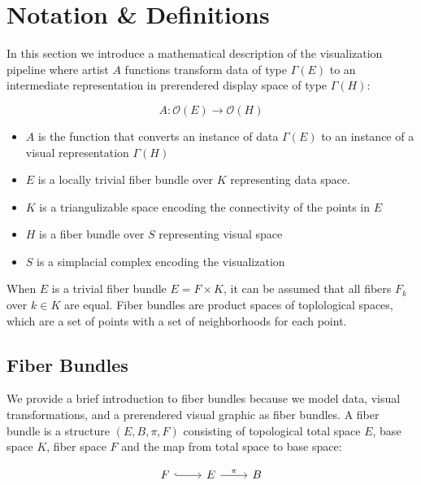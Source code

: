 \documentclass[../main.tex]{subfiles}
\begin{document}
\section{Notation \& Definitions}
In this section we introduce a mathematical description of the visualization pipeline where artist $A$ functions transform data of type $\Gamma(E)$ to an intermediate representation in prerendered display space of type $\Gamma(H)$:

\begin{equation}
    \label{eq:artist}
    A: \mathcal{O}(E) \rightarrow \mathcal{O}(H)
\end{equation}

\begin{itemize}
\item $A$ is the function that converts an instance of data $\Gamma(E)$ to an instance of a visual representation $\Gamma(H)$ 
\item $E$ is a locally trivial fiber bundle over $K$ representing data space.
\item $K$ is a triangulizable space encoding the connectivity of the points in $E$
\item $H$ is a fiber bundle over $S$ representing visual space
\item $S$ is a simplacial complex encoding the visualization
\end{itemize}

When $E$ is a trivial fiber bundle $E = F \times K$, it can be assumed that all fibers $F_{k}$ over $k \in K$ are equal. Fiber bundles are product spaces of toplological spaces, which are a set of points with a set of neighborhoods for each point\cite{FiberBundle2020, rowlandFiberBundle}.

\subsection{Fiber Bundles}
We provide a brief introduction to fiber bundles because we model data, visual transformations, and a prerendered visual graphic as fiber bundles. A fiber bundle is a structure $(E, B, \pi, F)$  consisting of topological total space $E$, base space $K$, fiber space $F$ and the map from total space to base space:

\begin{equation}
    \label{eq:fiber_bundle}
    \begin{tikzcd}
        F \arrow[r, hook] & E \arrow[r, "\pi"] & B
    \end{tikzcd}
\end{equation}
\end{document}
